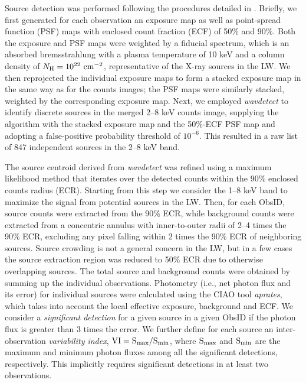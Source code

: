 \documentclass[fleqn,usenatbib]{mnras}
\begin{document}
Source detection was performed following the procedures detailed in \citet{2018ApJS..235...26Z}.
Briefly, we first generated for each observation an exposure map as well as point-spread function (PSF) maps with enclosed count fraction (ECF) of 50\% and 90\%. 
Both the exposure and PSF maps were weighted by a fiducial spectrum, which is an absorbed bremsstrahlung with a plasma temperature of 10 keV and a column density of $N_{\rm H}=10^{22}{\rm~cm^{-2}}$, representative of the X-ray sources in the LW. 
We then reprojected the individual exposure maps to form a stacked exposure map in the same way as for the counts images; the PSF maps were similarly stacked, weighted by the corresponding exposure map. 
Next, we employed {\it wavdetect} to identify discrete sources in the merged 2--8 keV counts image, supplying the algorithm with the stacked exposure map and the 50\%-ECF PSF map and adopting a false-positive probability threshold of $10^{-6}$. 
This resulted in a raw list of 847 independent sources in the 2--8 keV band. 

The source centroid derived from {\it wavdetect} was refined using a maximum likelihood method that iterates over the detected counts within the 90\% enclosed counts radius (ECR).
Starting from this step we consider the 1--8 keV band to maximize the signal from potential sources in the LW. 
Then, for each ObsID, source counts were extracted from the 90\% ECR, while background counts were extracted from a concentric annulus with inner-to-outer radii of 2--4 times the 90\% ECR, excluding any pixel falling within 2 times the 90\% ECR of neighboring sources.
Source crowding is not a general concern in the LW, but in a few cases the source extraction region was reduced to 50\% ECR due to otherwise overlapping sources. 
The total source and background counts were obtained by summing up the individual observations. 
Photometry (i.e., net photon flux and its error) for individual sources were calculated using the CIAO tool \emph{aprates}, which takes into account the local effective exposure, background and ECF. 
We consider a {\it significant detection} for a given source in a given ObsID if the photon flux is greater than 3 times the error. 
We further define for each source an inter-observation {\it variability index}, $\rm VI=S_{max}/S_{min}$, where $\rm S_{max}$ and $\rm S_{min}$ are the maximum and minimum photon fluxes among all the significant detections, respectively. This implicitly requires significant detections in at least two observations.
\end{document}
